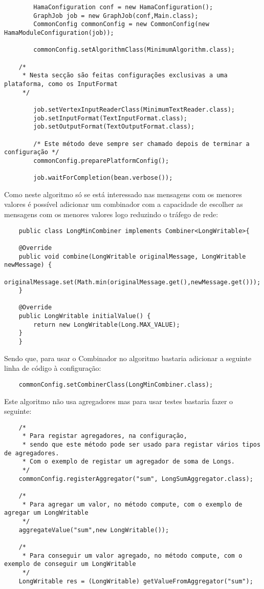		\begin{verbatim}
		HamaConfiguration conf = new HamaConfiguration();
		GraphJob job = new GraphJob(conf,Main.class);
		CommonConfig commonConfig = new CommonConfig(new HamaModuleConfiguration(job));
	
		commonConfig.setAlgorithmClass(MinimumAlgorithm.class);
	
	/* 
	 * Nesta secção são feitas configurações exclusivas a uma plataforma, como os InputFormat
	 */
	
		job.setVertexInputReaderClass(MinimumTextReader.class);
		job.setInputFormat(TextInputFormat.class);
		job.setOutputFormat(TextOutputFormat.class);
	
		/* Este método deve sempre ser chamado depois de terminar a configuração */
		commonConfig.preparePlatformConfig();
		
		job.waitForCompletion(bean.verbose());

	\end{verbatim}
	Como neste algoritmo só se está interessado nas mensagens com os menores valores é possível adicionar um combinador com a capacidade de escolher as mensagens com os menores valores logo reduzindo o tráfego de rede:
	\begin{verbatim}
	public class LongMinCombiner implements Combiner<LongWritable>{

	@Override
	public void combine(LongWritable originalMessage, LongWritable newMessage) {
		originalMessage.set(Math.min(originalMessage.get(),newMessage.get()));
	}

	@Override
	public LongWritable initialValue() {
		return new LongWritable(Long.MAX_VALUE);
	}
	}
	\end{verbatim}
	Sendo que, para usar o Combinador no algoritmo bastaria adicionar a seguinte linha de código à configuração: 
	\begin{verbatim}
	commonConfig.setCombinerClass(LongMinCombiner.class);
	\end{verbatim}
	Este algoritmo não usa agregadores mas para usar testes bastaria fazer o seguinte:
	\begin{verbatim}
	/* 
	 * Para registar agregadores, na configuração,
	 * sendo que este método pode ser usado para registar vários tipos de agregadores.
	 * Com o exemplo de registar um agregador de soma de Longs.
	 */
	commonConfig.registerAggregator("sum", LongSumAggregator.class);
	
	/*
	 * Para agregar um valor, no método compute, com o exemplo de agregar um LongWritable
	 */
	aggregateValue("sum",new LongWritable());
	
	/*
	 * Para conseguir um valor agregado, no método compute, com o exemplo de conseguir um LongWritable
	 */
	LongWritable res = (LongWritable) getValueFromAggregator("sum");
	\end{verbatim}
